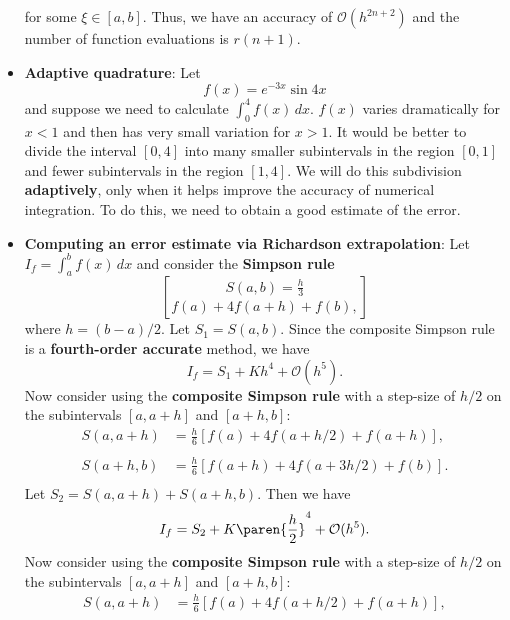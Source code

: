 \documentclass{report}
\begin{document}
\begin{itemize}
            for some $\xi \in [a,b]$.
            Thus, we have an accuracy of $\mathcal{O}(h^{2n+2})$ and the number of function evaluations is $r(n+1)$.
        \item \textbf{Adaptive quadrature}: 
            Let 
            $$f(x) = e^{-3x} \sin 4x$$
            and suppose we need to calculate $\int_0^4 f(x)\,dx$.
            \bigbreak \noindent 
            $f(x)$ varies dramatically for $x < 1$ and then has very small variation for $x > 1$.
            It would be better to divide the interval $[0,4]$ into many smaller subintervals in the region $[0,1]$ and fewer subintervals in the region $[1,4]$.
            \bigbreak \noindent 
            We will do this subdivision \textbf{adaptively}, only when it helps improve the accuracy of numerical integration.
            \bigbreak \noindent 
            To do this, we need to obtain a good estimate of the error.
        \item \textbf{Computing an error estimate via Richardson extrapolation}: 
            Let $I_f = \int_a^b f(x) \,dx$ and consider the \textbf{Simpson rule} 
            $$S(a,b) = \frac{h}{3} \brack{f(a) + 4f(a+h) + f(b)},$$
            where $h = (b - a)/2$. 
            \bigbreak \noindent 
            Let $S_1 = S(a,b)$.
            \bigbreak \noindent 
            Since the composite Simpson rule is a \textbf{fourth-order accurate} method, we have
            $$I_f = S_1 + Kh^4 + \mathcal{O}(h^5).$$
            Now consider using the \textbf{composite Simpson rule} with a step-size of $h/2$ on the subintervals $[a,a+h]$ and $[a+h,b]$:
            \begin{align*}
                S(a,a+h) &= \frac{h}{6}\left[f(a) + 4f(a + h/2) + f(a + h)\right],\\
                \\
            S(a+h,b) &= \frac{h}{6}\left[f(a+h) + 4f(a + 3h/2) + f(b)\right].\\
            \end{align*}
            Let $S_2 = S(a,a+h) + S(a+h,b)$.
            \bigbreak \noindent 
            Then we have
            $$I_f = S_2 + K\paren{\frac{h}{2}}^4 + \mathcal{O}(h^5).$$
            \bigbreak \noindent 
            Now consider using the \textbf{composite Simpson rule} with a step-size of $h/2$ on the subintervals $[a,a+h]$ and $[a+h,b]$:
            \begin{align*}
                S(a,a+h) &= \frac{h}{6}\left[f(a) + 4f(a + h/2) + f(a + h)\right],\\
                \\

\end{align*}
\end{itemize}
\end{document}

